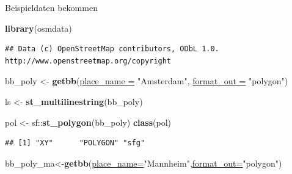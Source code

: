 \documentclass[ignorenonframetext,]{beamer}
\newenvironment{Shaded}{\begin{snugshade}}{\end{snugshade}}
\newcommand{\DataTypeTok}[1]{\textcolor[rgb]{0.74,0.68,0.62}{\underline{#1}}}
\newcommand{\KeywordTok}[1]{\textcolor[rgb]{0.26,0.66,0.93}{\textbf{#1}}}
\newcommand{\NormalTok}[1]{\textcolor[rgb]{0.74,0.68,0.62}{#1}}
\newcommand{\OperatorTok}[1]{\textcolor[rgb]{0.74,0.68,0.62}{#1}}
\newcommand{\StringTok}[1]{\textcolor[rgb]{0.02,0.61,0.04}{#1}}
\begin{document}
\begin{frame}[fragile]{Beispieldaten bekommen}
\protect\hypertarget{beispieldaten-bekommen}{}

\begin{Shaded}
\begin{Highlighting}[]
\KeywordTok{library}\NormalTok{(osmdata)}
\end{Highlighting}
\end{Shaded}

\begin{verbatim}
## Data (c) OpenStreetMap contributors, ODbL 1.0. http://www.openstreetmap.org/copyright
\end{verbatim}

\begin{Shaded}
\begin{Highlighting}[]
\NormalTok{bb_poly <-}\StringTok{ }\KeywordTok{getbb}\NormalTok{(}\DataTypeTok{place_name =} \StringTok{"Amsterdam"}\NormalTok{, }
                 \DataTypeTok{format_out =} \StringTok{"polygon"}\NormalTok{)}
\end{Highlighting}
\end{Shaded}

\begin{Shaded}
\begin{Highlighting}[]
\NormalTok{ls <-}\StringTok{ }\KeywordTok{st_multilinestring}\NormalTok{(bb_poly)}
\end{Highlighting}
\end{Shaded}

\begin{Shaded}
\begin{Highlighting}[]
\NormalTok{pol <-}\StringTok{ }\NormalTok{sf}\OperatorTok{::}\KeywordTok{st_polygon}\NormalTok{(bb_poly)}
\KeywordTok{class}\NormalTok{(pol)}
\end{Highlighting}
\end{Shaded}

\begin{verbatim}
## [1] "XY"      "POLYGON" "sfg"
\end{verbatim}

\begin{Shaded}
\begin{Highlighting}[]
\NormalTok{bb_poly_ma<-}\KeywordTok{getbb}\NormalTok{(}\DataTypeTok{place_name=}\StringTok{"Mannheim"}\NormalTok{,}\DataTypeTok{format_out=}\StringTok{"polygon"}\NormalTok{)}
\end{Highlighting}
\end{Shaded}

\end{frame}
\end{document}
